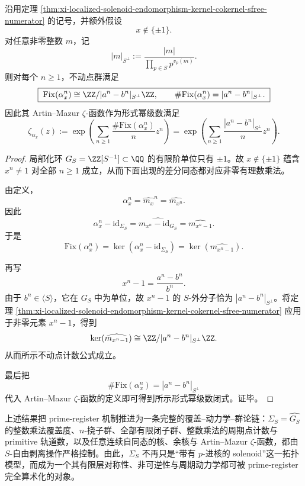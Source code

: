 

\begin{theorem}\label{thm:xi-localized-solenoid-general-endomorphism-periodic-zeta}
沿用定理 \ref{thm:xi-localized-solenoid-endomorphism-kernel-cokernel-sfree-numerator} 的记号，并额外假设
\[
x\notin\{\pm 1\}.
\]
对任意非零整数 \(m\)，记
\[
|m|_{S^\perp}:=\frac{|m|}{\prod_{p\in S}p^{v_p(m)}}.
\]
则对每个 \(n\ge 1\)，不动点群满足
\[
\boxed{\;
\mathrm{Fix}(\alpha_x^n)
\cong
\ZZ/|a^n-b^n|_{S^\perp}\ZZ,
\qquad
\#\mathrm{Fix}(\alpha_x^n)=|a^n-b^n|_{S^\perp}.\;}
\]
因此其 Artin--Mazur \(\zeta\)-函数作为形式幂级数满足
\[
\boxed{\;
\zeta_{\alpha_x}(z)
:=
\exp\!\left(
\sum_{n\ge 1}\frac{\#\mathrm{Fix}(\alpha_x^n)}{n}z^n
\right)
=
\exp\!\left(
\sum_{n\ge 1}\frac{|a^n-b^n|_{S^\perp}}{n}z^n
\right).\;}
\]
\end{theorem}
\begin{proof}
局部化环 \(G_S=\ZZ[S^{-1}]\subset \QQ\) 的有限阶单位只有 \(\pm1\)。故 \(x\notin\{\pm1\}\) 蕴含 \(x^n\neq 1\) 对全部 \(n\ge 1\) 成立，从而下面出现的差分同态都对应非零有理数乘法。

由定义，
\[
\alpha_x^n=\widehat{m_x}^n=\widehat{m_{x^n}}.
\]
因此
\[
\alpha_x^n-\mathrm{id}_{\Sigma_S}
=
\widehat{m_{x^n}-\mathrm{id}_{G_S}}
=
\widehat{m_{x^n-1}}.
\]
于是
\[
\mathrm{Fix}(\alpha_x^n)
=
\ker(\alpha_x^n-\mathrm{id}_{\Sigma_S})
=
\ker(\widehat{m_{x^n-1}}).
\]

再写
\[
x^n-1=\frac{a^n-b^n}{b^n}.
\]
由于 \(b^n\in\langle S\rangle\)，它在 \(G_S\) 中为单位，故 \(x^n-1\) 的 \(S\)-外分子恰为 \(|a^n-b^n|_{S^\perp}\)。将定理 \ref{thm:xi-localized-solenoid-endomorphism-kernel-cokernel-sfree-numerator} 应用于非零元素 \(x^n-1\)，得到
\[
\ker(\widehat{m_{x^n-1}})
\cong
\ZZ/|a^n-b^n|_{S^\perp}\ZZ.
\]
从而所示不动点计数公式成立。

最后把
\[
\#\mathrm{Fix}(\alpha_x^n)=|a^n-b^n|_{S^\perp}
\]
代入 Artin--Mazur \(\zeta\)-函数的定义即可得到所示形式幂级数闭式。证毕。
\end{proof}

\noindent
上述结果把 prime-register 机制推进为一条完整的覆盖--动力学--群论链：\(\Sigma_S=\widehat{G_S}\) 的整数乘法覆盖度、\(n\)-挠子群、全部有限闭子群、整数乘法的周期点计数与 primitive 轨道数，以及任意连续自同态的核、余核与 Artin--Mazur \(\zeta\)-函数，都由 \(S\)-自由剥离操作严格控制。由此，\(\Sigma_S\) 不再只是“带有 \(p\)-进核的 solenoid”这一拓扑模型，而成为一个其有限层对称性、非可逆性与周期动力学都可被 prime-register 完全算术化的对象。

\endinput
